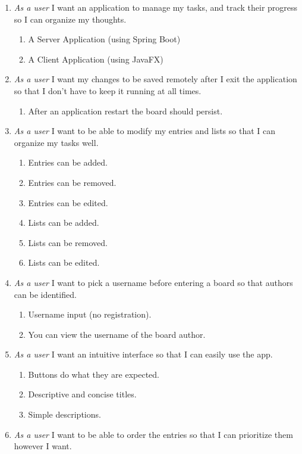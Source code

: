 \documentclass{article}
\begin{document}
	\begin{enumerate}
		\item \emph{As a user} I want an application to manage my tasks, and track their progress so I can organize my thoughts.
		\begin{enumerate}
			\item A Server Application (using Spring Boot)
			\item A Client Application (using JavaFX)
		\end{enumerate}

	\item \emph{As a user} I want my changes to be saved remotely after I exit the application so that I don't have to keep it running at all times.	
		\begin{enumerate}
			\item After an application restart the board should persist.
		\end{enumerate}
	\item \emph{As a user} I want to be able to modify my entries and lists so that I can organize my tasks well.
		\begin{enumerate}
			\item Entries can be added.
			\item Entries can be removed.
			\item Entries can be edited.
			\item Lists can be added.
			\item Lists can be removed.
			\item Lists can be edited.
		\end{enumerate}
	\item \emph{As a user} I want to pick a username before entering a board so that authors can be identified.
		\begin{enumerate}
			\item Username input (no registration).
			\item You can view the username of the board author.
		\end{enumerate}
	\item \emph{As a user} I want an intuitive interface so that I can easily use the app.
		\begin{enumerate}
			\item Buttons do what they are expected.
			\item Descriptive and concise titles.
			\item Simple descriptions.
		\end{enumerate}
	\item \emph{As a user} I want to be able to order the entries so that I can prioritize them however I want.

\end{enumerate}
\end{document}
